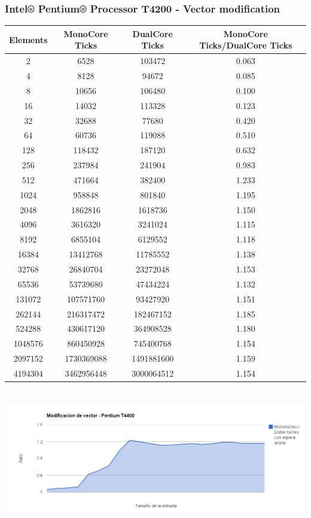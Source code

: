\subsubsection{Intel® Pentium® Processor T4200 - Vector modification}
\begin{center}
\begin{tabular}{|c|c|c|c|}
	\hline	
		Elements & MonoCore Ticks & DualCore Ticks & MonoCore Ticks/DualCore Ticks\\
	\hline	
		2 & 6528 & 103472 & 0.063\\
	\hline	
		4 & 8128 & 94672 & 0.085\\
	\hline	
		8 & 10656 & 106480 & 0.100\\
	\hline	
		16 & 14032 & 113328 & 0.123\\
	\hline	
		32 & 32688 & 77680 & 0.420\\
	\hline	
		64 & 60736 & 119088 & 0.510\\
	\hline	
		128 & 118432 & 187120 & 0.632\\
	\hline	
		256 & 237984 & 241904 & 0.983\\
	\hline	
		512 & 471664 & 382400 & 1.233\\
	\hline	
		1024 & 958848 & 801840 & 1.195\\
	\hline	
		2048 & 1862816 & 1618736 & 1.150\\
	\hline	
		4096 & 3616320 & 3241024 & 1.115\\
	\hline	
		8192 & 6855104 & 6129552 & 1.118\\
	\hline	
		16384 & 13412768 & 11785552 & 1.138\\
	\hline	
		32768 & 26840704 & 23272048 & 1.153\\
	\hline	
		65536 & 53739680 & 47434224 & 1.132\\
	\hline	
		131072 & 107571760 & 93427920 & 1.151\\
	\hline	
		262144 & 216317472 & 182467152 & 1.185\\
	\hline	
		524288 & 430617120 & 364908528 & 1.180\\
	\hline	
		1048576 & 860450928 & 745400768 & 1.154\\
	\hline	
		2097152 & 1730369088 & 1491881600 & 1.159\\
	\hline	
		4194304 & 3462956448 & 3000064512 & 1.154\\
	\hline
\end{tabular}
\end{center}
\begin{center}
    \includegraphics[height=6cm]{images/pentium_d_vectorsum.png}
\end{center}
